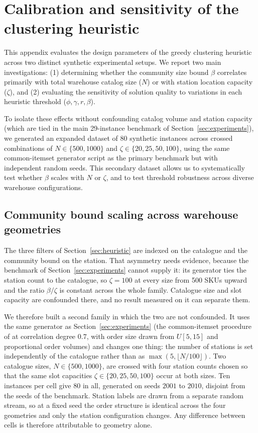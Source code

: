 \documentclass[]{interact}
\begin{document}
\section{Calibration and sensitivity of the clustering heuristic}\label{app:calibration}
This appendix evaluates the design parameters of the greedy clustering heuristic across two distinct synthetic experimental setups. We report two main investigations: (1) determining whether the community size bound $\beta$ correlates primarily with total warehouse catalog size ($N$) or with station location capacity ($\zeta$), and (2) evaluating the sensitivity of solution quality to variations in each heuristic threshold ($\phi, \gamma, r, \beta$). 

To isolate these effects without confounding catalog volume and station capacity (which are tied in the main 29-instance benchmark of Section~\ref{sec:experiments}), we generated an expanded dataset of 80 synthetic instances across crossed combinations of $N \in \{500, 1000\}$ and $\zeta \in \{20, 25, 50, 100\}$, using the same common-itemset generator script as the primary benchmark but with independent random seeds. This secondary dataset allows us to systematically test whether $\beta$ scales with $N$ or $\zeta$, and to test threshold robustness across diverse warehouse configurations.

\subsection{Community bound scaling across warehouse geometries}\label{app:capsweep}
The three filters of Section~\ref{sec:heuristic} are indexed on the catalogue and the community bound on the station. That asymmetry needs evidence, because the benchmark of Section~\ref{sec:experiments} cannot supply it: its generator ties the station count to the catalogue, so $\zeta=100$ at every size from 500 SKUs upward and the ratio $\beta/\zeta$ is constant across the whole family. Catalogue size and slot capacity are confounded there, and no result measured on it can separate them.

We therefore built a second family in which the two are not confounded. It uses the same generator as Section~\ref{sec:experiments} (the common-itemset procedure of \citet{zhang2019cie} at correlation degree $0.7$, with order size drawn from $U[5,15]$ and proportional order volumes) and changes one thing: the number of stations is set independently of the catalogue rather than as $\max(5,\lfloor N/100\rfloor)$. Two catalogue sizes, $N\in\{500,1000\}$, are crossed with four station counts chosen so that the same slot capacities $\zeta\in\{20,25,50,100\}$ occur at both sizes. Ten instances per cell give 80 in all, generated on seeds $2001$ to $2010$, disjoint from the seeds of the benchmark. Station labels are drawn from a separate random stream, so at a fixed seed the order structure is identical across the four geometries and only the station configuration changes. Any difference between cells is therefore attributable to geometry alone.
\end{document}
